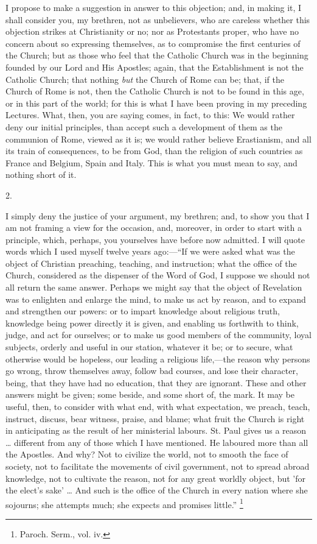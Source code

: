 I propose to make a suggestion in answer to this objection; and, in
making it, I shall consider you, my brethren, not as unbelievers, who
are careless whether this objection strikes at Christianity or no; nor
as Protestants proper, who have no concern about so expressing
themselves, as to compromise the first centuries of the Church; but as
those who feel that the Catholic Church was in the beginning founded
by our Lord and His Apostles; again, that the Establishment is not the
Catholic Church; that nothing \emph{but} the Church of Rome can be;
that, if the Church of Rome is not, then the Catholic Church is not to
be found in this age, or in this part of the world; for this is what I
have been proving in my preceding Lectures. What, then, you are saying
comes, in fact, to this: We would rather deny our initial principles,
than accept such a development of them as the communion of Rome,
viewed as it is; we would rather believe Erastianism, and all its
train of consequences, to be from God, than the religion of such
countries as France and Belgium, Spain and Italy. This is what you
must mean to say, and nothing short of it.

2.

I simply deny the justice of your argument, my brethren; and, to
show you that I am not framing a view for the occasion, and, moreover,
in order to start with a principle, which, perhaps, you yourselves
have before now admitted. I will quote words which I used myself
twelve years ago:—``If we were asked what was the object of
Christian preaching, teaching, and instruction; what the office of the
Church, considered as the dispenser of the Word of God, I suppose we
should not all return the same answer. Perhaps we might say that the
object of Revelation was to enlighten and enlarge the mind, to make us
act by reason, and to expand and strengthen our powers: or to impart
knowledge about religious truth, knowledge being power directly it is
given, and enabling us forthwith to think, judge, and act for
ourselves; or to make us good members of the community, loyal
subjects, orderly and useful in our station, whatever it be; or to
secure, what otherwise would be hopeless, our leading a religious
life,—the reason why persons go wrong, throw themselves away, follow
bad courses, and lose their character, being, that they have had no
education, that they are ignorant. These and other answers might be
given; some beside, and some short of, the mark. It may be useful,
then, to consider with what end, with what expectation, we preach,
teach, instruct, discuss, bear witness, praise, and blame; what fruit
the Church is right in anticipating as the result of her ministerial
labours. St. Paul gives us a reason … different from any of those
which I have mentioned. He laboured more than all the Apostles. And
why? Not to civilize the world, not to smooth the face of society, not
to facilitate the movements of civil government, not to spread abroad
knowledge, not to cultivate the reason, not for any great worldly
object, but 'for the elect's sake' … And such is the office of the
Church in every nation where she sojourns; she attempts much; she
expects and promises little.'' \footnote{Paroch. Serm., vol. iv.}

